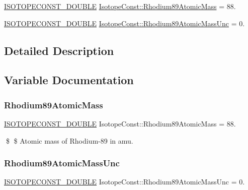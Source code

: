 \begin{DoxyCompactItemize}
\item 
\mbox{\hyperlink{group___isotope_const-_macros_ga8f45a7272ce02c0b4c65c44636ed719a}{I\+S\+O\+T\+O\+P\+E\+C\+O\+N\+S\+T\+\_\+\+D\+O\+U\+B\+LE}} \mbox{\hyperlink{group___isotope_const-_rhodium-_rh89_ga4e3c7f956c80d26e22eb07d312606075}{Isotope\+Const\+::\+Rhodium89\+Atomic\+Mass}} = 88.
\item 
\mbox{\hyperlink{group___isotope_const-_macros_ga8f45a7272ce02c0b4c65c44636ed719a}{I\+S\+O\+T\+O\+P\+E\+C\+O\+N\+S\+T\+\_\+\+D\+O\+U\+B\+LE}} \mbox{\hyperlink{group___isotope_const-_rhodium-_rh89_ga589299546eb1fcc846b7146e321f7380}{Isotope\+Const\+::\+Rhodium89\+Atomic\+Mass\+Unc}} = 0.
\end{DoxyCompactItemize}


\subsection{Detailed Description}


\subsection{Variable Documentation}
\mbox{\label{group___isotope_const-_rhodium-_rh89_ga4e3c7f956c80d26e22eb07d312606075}} 
\subsubsection{\texorpdfstring{Rhodium89\+Atomic\+Mass}{Rhodium89AtomicMass}}
{\footnotesize\ttfamily \mbox{\hyperlink{group___isotope_const-_macros_ga8f45a7272ce02c0b4c65c44636ed719a}{I\+S\+O\+T\+O\+P\+E\+C\+O\+N\+S\+T\+\_\+\+D\+O\+U\+B\+LE}} Isotope\+Const\+::\+Rhodium89\+Atomic\+Mass = 88.}

\$ \$ Atomic mass of Rhodium-\/89 in amu. \mbox{\label{group___isotope_const-_rhodium-_rh89_ga589299546eb1fcc846b7146e321f7380}} 
\subsubsection{\texorpdfstring{Rhodium89\+Atomic\+Mass\+Unc}{Rhodium89AtomicMassUnc}}
{\footnotesize\ttfamily \mbox{\hyperlink{group___isotope_const-_macros_ga8f45a7272ce02c0b4c65c44636ed719a}{I\+S\+O\+T\+O\+P\+E\+C\+O\+N\+S\+T\+\_\+\+D\+O\+U\+B\+LE}} Isotope\+Const\+::\+Rhodium89\+Atomic\+Mass\+Unc = 0.}

